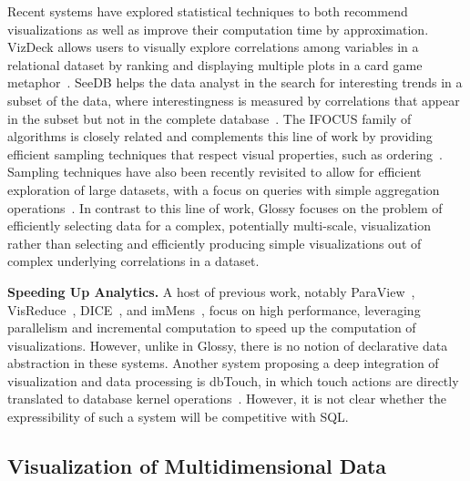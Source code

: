 \documentclass[11pt, oneside]{report}
\newcommand{\minisec}[1]{\noindent\textbf{#1.}}
\begin{document}
{Recent systems have explored statistical techniques to both recommend visualizations as well as improve their computation time by approximation. VizDeck allows users to visually explore correlations among variables in a relational dataset by ranking and displaying multiple plots in a card game metaphor~\cite{key2012vizdeck}. SeeDB helps the data analyst in the search for interesting trends in a subset of the data, where interestingness is measured by correlations that appear in the subset but not in the complete database~\cite{vartak2014seedb}. The IFOCUS family of algorithms is closely related and complements this line of work by providing efficient sampling techniques that respect visual properties, such as ordering~\cite{blais2014generating}. Sampling techniques have also been recently revisited to allow for efficient exploration of large datasets, with a focus on queries with simple aggregation operations~\cite{agarwal2014blink,nirkhiwale2013sampling,sidirourgos2011sciborq}.  In contrast to this line of work, Glossy focuses on the problem of efficiently selecting data for a complex, potentially multi-scale, visualization rather than selecting and efficiently producing simple visualizations out of complex underlying correlations in a dataset. 

\minisec{Speeding Up Analytics}
A host of previous work, notably ParaView~\cite{henderson2004paraview}, VisReduce~\cite{Im2013visreduce}, DICE~\cite{kamat2014cubeexploration}, and imMens~\cite{liu2013immens}, focus on high performance, leveraging parallelism and incremental computation to speed up the computation of visualizations. However, unlike in Glossy, there is no notion of declarative data abstraction in these systems. Another system proposing a deep integration of visualization and data processing is dbTouch, in which touch actions are directly translated to database kernel operations~\cite{idreos2013dbtouch}. However, it is not clear whether the expressibility of such a system will be competitive with SQL.\newline

\subsection{Visualization of Multidimensional Data}
\label{sec:related:multidimensional}

}
\end{document}

